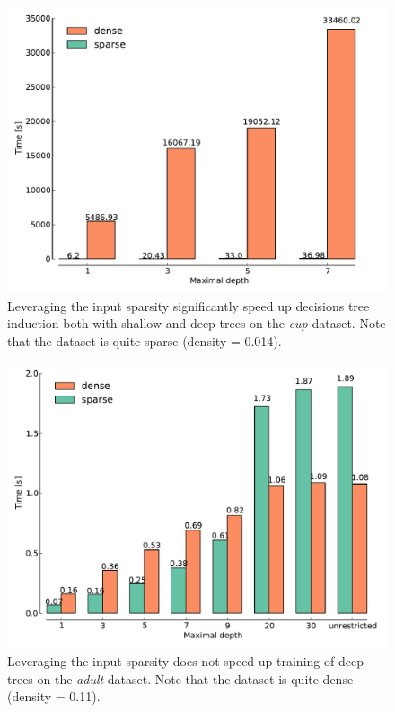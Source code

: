 \begin{figure}[h]
\centering
\includegraphics[scale=0.45]{images/cup.pdf}
\caption{Leveraging the input sparsity significantly speed up decisions
         tree induction both with shallow and deep trees on the \emph{cup}
         dataset. Note that the dataset is quite sparse (density = 0.014).}
\label{fig:cup}
\end{figure}



\begin{figure}[h]
\centering
\includegraphics[scale=0.45]{images/adult.pdf}
\caption{Leveraging the input sparsity does not speed up training of deep trees on the \emph{adult}
         dataset. Note that the dataset is quite dense (density = 0.11).}
\label{fig:adult}
\end{figure}


